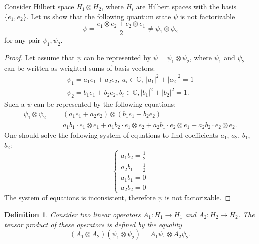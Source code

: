 \documentclass[%
master,         %
subf,           %
href,           %
colorlinks=true %
]{disser}
\numberwithin{equation}{section}
\numberwithin{figure}{section}
\newtheorem{definition}{Definition}[section]
\begin{document}
Consider Hilbert space $H_1\otimes H_2$, where $H_i$ are Hilbert spaces with the basis $\{e_1, e_2\}$. Let us show that the following quantum state $\psi$ is not factorizable
\[
	\psi = \frac{e_1 \otimes e_2 + e_2 \otimes e_1}{2} \ne \psi_1 \otimes \psi_2
\]
for any pair $\psi_1, \psi_2$.
\begin{proof}
Let assume that $\psi$ can be represented by $\psi = \psi_1\otimes\psi_2$, where
$\psi_1$ and $\psi_2$ can be written as weighted sums of basis vectors:
\begin{gather*}
	\psi_1 = a_1 e_1 + a_2 e_2,\ a_i\in \mathbb{C},\ |a_1|^2 + |a_2|^2 = 1 \\
	\psi_2 = b_1 e_1 + b_2 e_2, b_i\in \mathbb{C}, |b_1|^2 + |b_2|^2 = 1.
\end{gather*}
Such a $\psi$ can be represented by the following equations:
\begin{eqnarray*}
	\psi_1 \otimes \psi_2 &=& (a_1 e_1 + a_2 e_2) \otimes (b_1 e_1 + b_2 e_2) = \\ &=&  
	a_1 b_1 \cdot e_1 \otimes e_1 + a_1 b_2 \cdot e_1 \otimes e_2 + 
	a_2 b_1 \cdot e_2 \otimes e_1 + a_2 b_2 \cdot e_2 \otimes e_2.
\end{eqnarray*}
One should solve the following system of equations to find coefficients $a_1$, $a_2$, $b_1$, $b_2$:
$$
\begin{cases}
a_1 b_2 = \frac12 \\
a_2 b_1 = \frac12 \\
a_1 b_1 = 0 \\
a_2 b_2 = 0
\end{cases}
$$
The system of equations is inconsistent, therefore $\psi$ is not factorizable.
\end{proof}
 
\begin{definition}
Consider two linear operators $A_1: H_1\to H_1$ and $A_2: H_2\to H_2$. The tensor product of these operators is defined by the equality
\[
(A_1\otimes A_2)(\psi_1\otimes \psi_2) = A_1\psi_1 \otimes A_2\psi_2.
\]
\end{definition}
\end{document}
